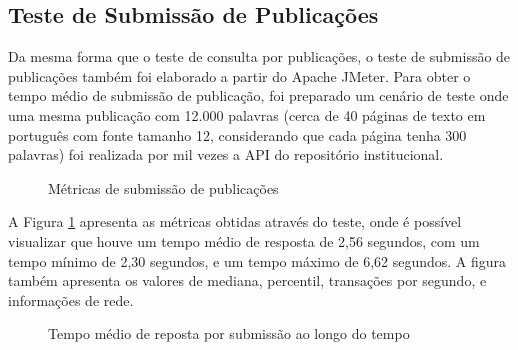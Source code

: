 \subsection{Teste de Submissão de Publicações}

Da mesma forma que o teste de consulta por publicações, o teste de submissão de
publicações também foi elaborado a partir do Apache JMeter. Para obter o tempo médio
de submissão de publicação, foi preparado um cenário de teste onde uma mesma publicação
com 12.000 palavras (cerca de 40 páginas de texto em português com fonte tamanho 12,
considerando que cada página tenha 300 palavras) foi realizada por mil vezes a API do
repositório institucional.

\begin{figure}[H]
    \caption{Métricas de submissão de publicações}
    \label{fig:matrics-create-research}
\end{figure}

A Figura \ref{fig:matrics-create-research} apresenta as métricas obtidas através do
teste, onde é possível visualizar que houve um tempo médio de resposta de 2,56 segundos,
com um tempo mínimo de 2,30 segundos, e um tempo máximo de 6,62 segundos. A figura também
apresenta os valores de mediana, percentil, transações por segundo, e informações de rede.

\begin{figure}[H]
    \caption{Tempo médio de reposta por submissão ao longo do tempo}
    \centering
    \label{fig:create-response-over-time}
\end{figure}

